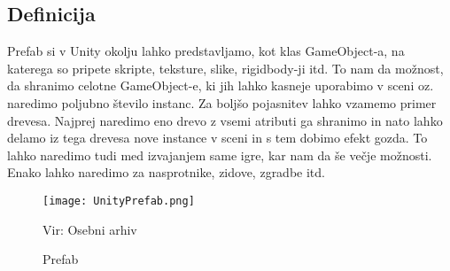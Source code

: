 {\color{indiagreen}\subsection{Definicija}}
Prefab si v Unity okolju lahko predstavljamo, kot klas GameObject-a, na katerega so pripete skripte, teksture, slike, rigidbody-ji itd. To nam da možnost, da shranimo celotne GameObject-e, ki jih lahko kasneje uporabimo v sceni oz. naredimo poljubno število instanc. Za boljšo pojasnitev lahko vzamemo primer drevesa. Najprej naredimo eno drevo z vsemi atributi ga shranimo in nato lahko delamo iz tega drevesa nove instance v sceni in s tem dobimo efekt gozda. To lahko naredimo tudi med izvajanjem same igre, kar nam da še večje možnosti. Enako lahko naredimo za nasprotnike, zidove, zgradbe itd.
\begin{figure}[ht!]
	\centering
	\texttt{[image: UnityPrefab.png]}
	\caption{Prefab}
	{\tiny Vir: Osebni arhiv}
\end{figure}